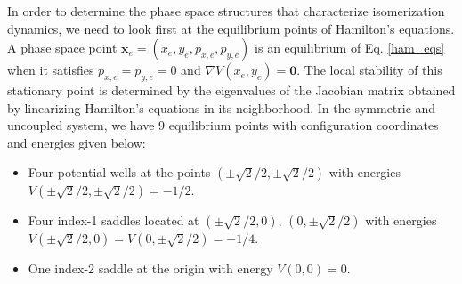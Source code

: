 \documentclass[10pt,aps,onecolumn,superscriptaddress]{revtex4-2}
\begin{document}
In order to determine the phase space structures that characterize isomerization dynamics, we need to look first at the equilibrium points of Hamilton's equations. A phase space point  $\mathbf{x}_e = (x_e,y_e,p_{x,e},p_{y,e})$ is an equilibrium of Eq. \eqref{ham_eqs} when it satisfies $p_{x,e} = p_{y,e} = 0$ and $\nabla V(x_e,y_e) = \mathbf{0}$. The local stability of this stationary point is determined by the eigenvalues of the Jacobian matrix obtained by linearizing Hamilton's equations in its neighborhood. In the symmetric and uncoupled system, we have 9 equilibrium points with configuration coordinates and energies given below: 
\begin{itemize}
	\item Four potential wells at the points $(\pm\sqrt{2}/2,\pm\sqrt{2}/2)$ with energies $V(\pm\sqrt{2}/2,\pm\sqrt{2}/2) = -1/2$. \\[-.5cm]
	\item Four index-1 saddles located at $(\pm\sqrt{2}/2,0)$, $(0,\pm\sqrt{2}/2)$ with energies $V(\pm\sqrt{2}/2,0) = V(0,\pm\sqrt{2}/2) = -1/4$. \\[-.5cm]
	\item One index-2 saddle at the origin with energy $V(0,0) = 0$.
\end{itemize}
\end{document}

